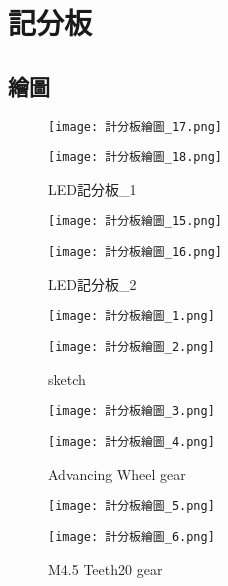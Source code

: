 \chapter{記分板}
\section{繪圖}
\begin{figure}[hbt!]
  \centering
  \texttt{[image: 計分板繪圖\_17.png]}
\end{figure}
\begin{figure}[hbt!]
  \centering
  \texttt{[image: 計分板繪圖\_18.png]}
  \caption{LED記分板_1}
  \label{fig:photo1}
\end{figure}

\begin{figure}[hbt!]
  \centering
  \texttt{[image: 計分板繪圖\_15.png]}
\end{figure}
\begin{figure}[hbt!]
  \centering
  \texttt{[image: 計分板繪圖\_16.png]}
  \caption{LED記分板_2}
  \label{fig:photo2}
\end{figure}

\begin{figure}[hbt!]
  \centering
  \texttt{[image: 計分板繪圖\_1.png]}
\end{figure}
\begin{figure}[hbt!]
  \centering
  \texttt{[image: 計分板繪圖\_2.png]}
  \caption{sketch}
  \label{fig:photo3}
\end{figure}

\begin{figure}[hbt!]
  \centering
  \texttt{[image: 計分板繪圖\_3.png]}
\end{figure}
\begin{figure}[hbt!]
  \centering
  \texttt{[image: 計分板繪圖\_4.png]}
  \caption{Advancing Wheel gear}
  \label{fig:photo4}
\end{figure}

\begin{figure}[hbt!]
  \centering
  \texttt{[image: 計分板繪圖\_5.png]}
\end{figure}
\begin{figure}[hbt!]
  \centering
  \texttt{[image: 計分板繪圖\_6.png]}
  \caption{M4.5 Teeth20 gear}
  \label{fig:photo5}
\end{figure}

